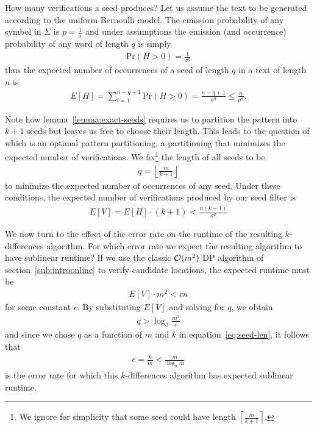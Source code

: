 How many verifications a seed produces?
Let us assume the text to be generated according to the uniform Bernoulli model.
The emission probability of any symbol in $\Sigma$ is $p = \frac{1}{\sigma}$ and under \iid assumptions the emission (and occurrence) probability of any word of length $q$ is simply
\begin{eqnarray}
\text{Pr}(H > 0) = \frac{1}{\sigma^q}
\end{eqnarray}
thus the expected number of occurrences of a seed of length $q$ in a text of length $n$ is
\begin{eqnarray}
E[H] = \sum_{i=1}^{n-q+1}{\text{Pr}(H > 0)} = \frac{n - q + 1}{\sigma^q} \leq \frac{n}{\sigma^q}.
\end{eqnarray}

Note how lemma~\ref{lemma:exact-seeds} requires us to partition the pattern into $k+1$ seeds but leaves us free to choose their length.
This leads to the question of which is an optimal pattern partitioning, \ie a partitioning that minimizes the expected number of verifications.
We fix\footnote{We ignore for simplicity that some seed could have length $\left \lceil \frac{m}{k+1} \right \rceil$.} the length of all seeds to be
\begin{eqnarray}
\label{eq:seed-len}
q=\left \lfloor \frac{m}{k+1} \right \rfloor
\end{eqnarray}
to minimize the expected number of occurrences of any seed.
Under these conditions, the expected number of verifications produced by our seed filter is
\begin{eqnarray}
E[V] = E[H] \cdot (k + 1) < \frac{n (k + 1)}{\sigma^q}
\end{eqnarray}

We now turn to the effect of the error rate on the runtime of the resulting $k$-differences algorithm.
For which error rate we expect the resulting algorithm to have sublinear runtime?
If we use the classic $\mathcal{O}(m^2)$ DP algorithm of section~\ref{sub:introonline} to verify candidate locations, the expected runtime must be
\begin{eqnarray}
E[V] \cdot m^2 < cn
\end{eqnarray}
for some constant $c$.
By substituting $E[V]$ and solving for $q$, we obtain
\begin{eqnarray}
q > \log_{\sigma}{\frac{m^3}{c}}
\end{eqnarray}
and since we chose $q$ as a function of $m$ and $k$ in equation~\ref{eq:seed-len}, it follows that
\begin{eqnarray}
\epsilon = \frac{k}{m} < \frac{m}{\log_{\sigma}{m}}
\end{eqnarray}
is the error rate for which this $k$-differences algorithm has expected sublinear runtime.

